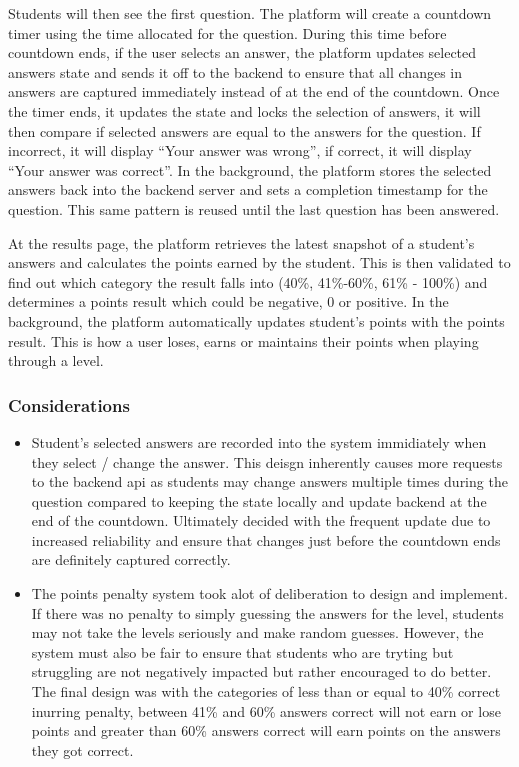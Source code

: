 Students will then see the first question. The platform will create a countdown timer using the time allocated for the question. During this time before countdown ends, if the user selects an answer, the platform updates selected answers state and sends it off to the backend to ensure that all changes in answers are captured immediately instead of at the end of the countdown. Once the timer ends, it updates the state and locks the selection of answers, it will then compare if selected answers are equal to the answers for the question. If incorrect, it will display “Your answer was wrong”, if correct, it will display “Your answer was correct”. In the background, the platform stores the selected answers back into the backend server and sets a completion timestamp for the question. This same pattern is reused until the last question has been answered. 

\newpage

At the results page, the platform retrieves the latest snapshot of a student's answers and calculates the points earned by the student. This is then validated to find out which category the result falls into (40\%, 41\%-60\%, 61\% - 100\%) and determines a points result which could be negative, 0 or positive. In the background, the platform automatically updates student’s points with the points result. This is how a user loses, earns or maintains their points when playing through a level.

\subsubsection{Considerations}
\begin{itemize}
    \item Student's selected answers are recorded into the system immidiately when they select / change the answer. This deisgn inherently causes more requests to the backend api as students may change answers multiple times during the question compared to keeping the state locally and update backend at the end of the countdown. Ultimately decided with the frequent update due to increased reliability and ensure that changes just before the countdown ends are definitely captured correctly.
    \item The points penalty system took alot of deliberation to design and implement. If there was no penalty to simply guessing the answers for the level, students may not take the levels seriously and make random guesses. However, the system must also be fair to ensure that students who are tryting but struggling are not negatively impacted but rather encouraged to do better. The final design was with the categories of less than or equal to 40\% correct inurring penalty, between 41\% and 60\% answers correct will not earn or lose points and greater than 60\% answers correct will earn points on the answers they got correct.
\end{itemize}

